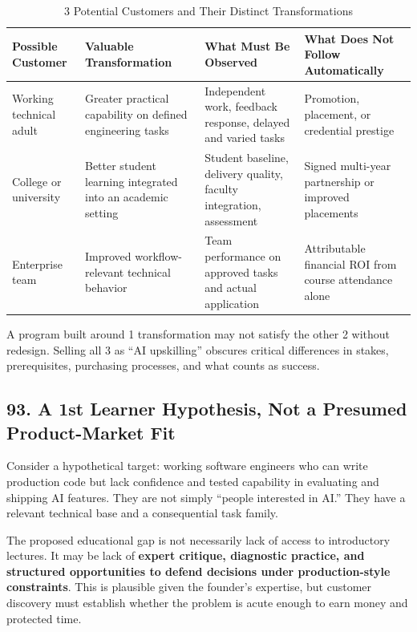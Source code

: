 \begin{table}[t]
\centering
\small
\caption{3 Potential Customers and Their Distinct Transformations}
\begin{tabularx}{\textwidth}{p{}p{}p{}X}
\toprule
\textbf{Possible Customer} & \textbf{Valuable Transformation} & \textbf{What Must Be Observed} & \textbf{What Does Not Follow Automatically} \\
\midrule
Working technical adult & Greater practical capability on defined engineering tasks & Independent work, feedback response, delayed and varied tasks & Promotion, placement, or credential prestige \\
College or university & Better student learning integrated into an academic setting & Student baseline, delivery quality, faculty integration, assessment & Signed multi-year partnership or improved placements \\
Enterprise team & Improved workflow-relevant technical behavior & Team performance on approved tasks and actual application & Attributable financial ROI from course attendance alone \\
\bottomrule
\end{tabularx}
\end{table}

A program built around 1 transformation may not satisfy the other 2 without redesign. Selling all 3 as ``AI upskilling'' obscures critical differences in stakes, prerequisites, purchasing processes, and what counts as success.

\subsection*{93. A 1st Learner Hypothesis, Not a Presumed Product-Market Fit}

Consider a hypothetical target: working software engineers who can write production code but lack confidence and tested capability in evaluating and shipping AI features. They are not simply ``people interested in AI.'' They have a relevant technical base and a consequential task family.

The proposed educational gap is not necessarily lack of access to introductory lectures. It may be lack of \textbf{expert critique, diagnostic practice, and structured opportunities to defend decisions under production-style constraints}. This is plausible given the founder's expertise, but customer discovery must establish whether the problem is acute enough to earn money and protected time.

